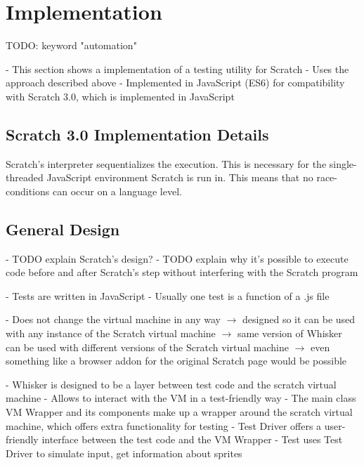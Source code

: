 
\chapter{Implementation}

TODO: keyword "automation"

- This section shows a implementation of a testing utility for Scratch
- Uses the approach described above
- Implemented in JavaScript (ES6) for compatibility with Scratch 3.0, which is implemented in JavaScript

\section {Scratch 3.0 Implementation Details}

Scratch's interpreter sequentializes the execution.
This is necessary for the single-threaded JavaScript environment Scratch is run in.
This means that no race-conditions can occur on a language level.

\section{General Design}

- TODO explain Scratch's design?
- TODO explain why it's possible to execute code before and after Scratch's step without interfering with the Scratch program

- Tests are written in JavaScript
- Usually one test is a function of a .js file

- Does not change the virtual machine in any way
    $\rightarrow$ designed so it can be used with any instance of the Scratch virtual machine
    $\rightarrow$ same version of Whisker can be used with different versions of the Scratch virtual machine
    $\rightarrow$ even something like a browser addon for the original Scratch page would be possible

- Whisker is designed to be a layer between test code and the scratch virtual machine
- Allows to interact with the VM in a test-friendly way
- The main class VM Wrapper and its components make up a wrapper around the scratch virtual machine,
  which offers extra functionality for testing
- Test Driver offers a user-friendly interface between the test code and the VM Wrapper
- Test uses Test Driver to simulate input, get information about sprites

